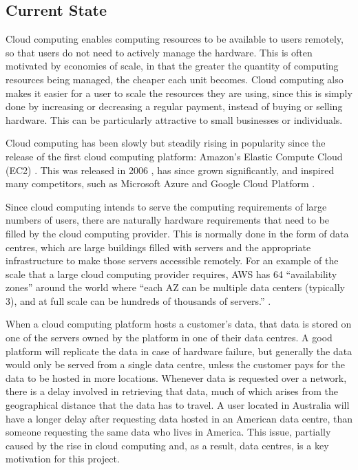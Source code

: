\subsection{Current State}
\label{current_state}

Cloud computing enables computing resources to be available to users remotely, so that users do not need to actively manage the hardware.
This is often motivated by economies of scale, in that the greater the quantity of computing resources being managed, the cheaper each unit becomes.
Cloud computing also makes it easier for a user to scale the resources they are using, since this is simply done by increasing or decreasing a regular payment, instead of buying or selling hardware. This can be particularly attractive to small businesses or individuals.

Cloud computing has been slowly but steadily rising in popularity since the release of the first cloud computing platform: Amazon's Elastic Compute Cloud (EC2) \cite{ec2}.
This was released in 2006 \cite{announce_ec2}, has since grown significantly, and inspired many competitors, such as Microsoft Azure \cite{azure} and Google Cloud Platform \cite{google_cloud}.

Since cloud computing intends to serve the computing requirements of large numbers of users, there are naturally hardware requirements that need to be filled by the cloud computing provider.
This is normally done in the form of data centres, which are large buildings filled with servers and the appropriate infrastructure to make those servers accessible remotely. For an example of the scale that a large cloud computing provider requires, AWS has 64 ``availability zones'' around the world where ``each AZ can be multiple data centers (typically 3), and at full scale can be hundreds of thousands of servers.'' \cite{aws_infrastructure_blog}.

When a cloud computing platform hosts a customer's data, that data is stored on one of the servers owned by the platform in one of their data centres. A good platform will replicate the data in case of hardware failure, but generally the data would only be served from a single data centre, unless the customer pays for the data to be hosted in more locations.
Whenever data is requested over a network, there is a delay involved in retrieving that data, much of which arises from the geographical distance that the data has to travel. A user located in Australia will have a longer delay after requesting data hosted in an American data centre, than someone requesting the same data who lives in America.
This issue, partially caused by the rise in cloud computing and, as a result, data centres, is a key motivation for this project.

